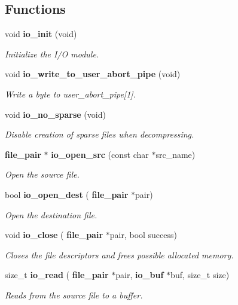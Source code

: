 \subsection*{Functions}
\begin{DoxyCompactItemize}
\item 
void \textbf{ io\+\_\+init} (void)
\begin{DoxyCompactList}\small\item\em Initialize the I/O module. \end{DoxyCompactList}\item 
void \textbf{ io\+\_\+write\+\_\+to\+\_\+user\+\_\+abort\+\_\+pipe} (void)
\begin{DoxyCompactList}\small\item\em Write a byte to user\+\_\+abort\+\_\+pipe[1]. \end{DoxyCompactList}\item 
void \textbf{ io\+\_\+no\+\_\+sparse} (void)
\begin{DoxyCompactList}\small\item\em Disable creation of sparse files when decompressing. \end{DoxyCompactList}\item 
\textbf{ file\+\_\+pair} $\ast$ \textbf{ io\+\_\+open\+\_\+src} (const char $\ast$src\+\_\+name)
\begin{DoxyCompactList}\small\item\em Open the source file. \end{DoxyCompactList}\item 
bool \textbf{ io\+\_\+open\+\_\+dest} (\textbf{ file\+\_\+pair} $\ast$pair)
\begin{DoxyCompactList}\small\item\em Open the destination file. \end{DoxyCompactList}\item 
void \textbf{ io\+\_\+close} (\textbf{ file\+\_\+pair} $\ast$pair, bool success)
\begin{DoxyCompactList}\small\item\em Closes the file descriptors and frees possible allocated memory. \end{DoxyCompactList}\item 
size\+\_\+t \textbf{ io\+\_\+read} (\textbf{ file\+\_\+pair} $\ast$pair, \textbf{ io\+\_\+buf} $\ast$buf, size\+\_\+t size)
\begin{DoxyCompactList}\small\item\em Reads from the source file to a buffer. \end{DoxyCompactList}\item 

\end{DoxyCompactItemize}
